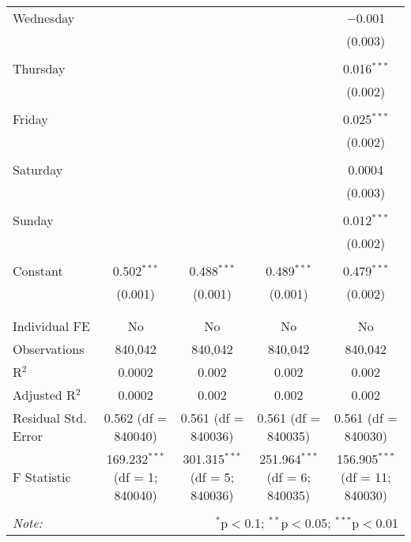 \documentclass[
]{article}
\begin{document}
\begin{table}[!htbp]
{\begin{tabular}{@{\extracolsep{5pt}}lcccc}
 Wednesday &  &  &  & $-$0.001 \\ 
  &  &  &  & (0.003) \\ 
  & & & & \\ 
 Thursday &  &  &  & 0.016$^{***}$ \\ 
  &  &  &  & (0.002) \\ 
  & & & & \\ 
 Friday &  &  &  & 0.025$^{***}$ \\ 
  &  &  &  & (0.002) \\ 
  & & & & \\ 
 Saturday &  &  &  & 0.0004 \\ 
  &  &  &  & (0.003) \\ 
  & & & & \\ 
 Sunday &  &  &  & 0.012$^{***}$ \\ 
  &  &  &  & (0.002) \\ 
  & & & & \\ 
 Constant & 0.502$^{***}$ & 0.488$^{***}$ & 0.489$^{***}$ & 0.479$^{***}$ \\ 
  & (0.001) & (0.001) & (0.001) & (0.002) \\ 
  & & & & \\ 
\hline \\[-1.8ex] 
Individual FE & No & No & No & No \\ 
Observations & 840,042 & 840,042 & 840,042 & 840,042 \\ 
R$^{2}$ & 0.0002 & 0.002 & 0.002 & 0.002 \\ 
Adjusted R$^{2}$ & 0.0002 & 0.002 & 0.002 & 0.002 \\ 
Residual Std. Error & 0.562 (df = 840040) & 0.561 (df = 840036) & 0.561 (df = 840035) & 0.561 (df = 840030) \\ 
F Statistic & 169.232$^{***}$ (df = 1; 840040) & 301.315$^{***}$ (df = 5; 840036) & 251.964$^{***}$ (df = 6; 840035) & 156.905$^{***}$ (df = 11; 840030) \\ 
\hline 
\hline \\[-1.8ex] 
\textit{Note:}  & \multicolumn{4}{r}{$^{*}$p$<$0.1; $^{**}$p$<$0.05; $^{***}$p$<$0.01} \\ 
\end{tabular}
} 
\end{table} 
\newpage
\end{document}
